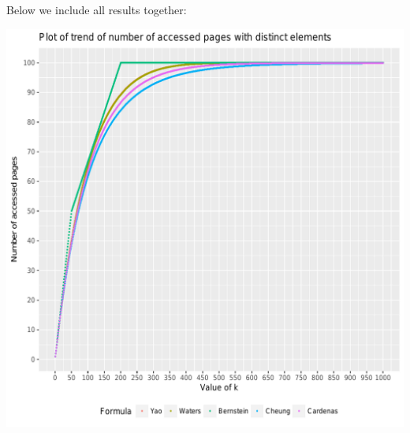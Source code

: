 \documentclass[12pt]{article}
\begin{document}
    Below we include all results together:
    \begin{center}
    \includegraphics[width=\textwidth]{all_approx.png}
    \end{center}
    
\end{document}
